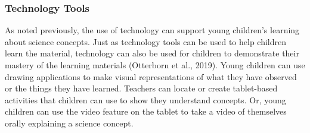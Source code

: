 \documentclass[11.5pt]{sig-alternate}
\begin{document}
\begin{large}
\begin{table}[h!]
\end{table}

\subsubsection*{Technology Tools }

As noted previously, the use of technology can support young children’s learning about science concepts. Just as technology tools can be used to help children learn the material, technology can also be used for children to demonstrate their mastery of the learning materials (Otterborn et al., 2019). Young children can use drawing applications to make visual representations of what they have observed or the things they have learned. Teachers can locate or create tablet-based activities that children can use to show they understand concepts. Or, young children can use the video feature on the tablet to take a video of themselves orally explaining a science concept. 


\end{large}
\end{document}

